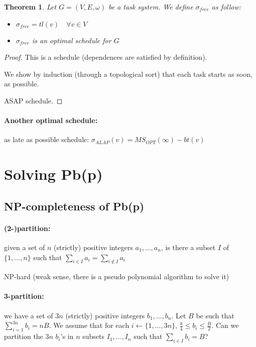 \documentclass{article}
\newtheorem{thm}{Theorem}
\begin{document}
\begin{thm}
Let $G=(V,E,\omega)$ be a task system. We define $\sigma_{free}$ as follow:
\begin{itemize}
\item $\sigma_{free}=tl(v) \quad \forall v \in V$
\item $\sigma_{free}$ is an optimal schedule for $G$
\end{itemize}
\end{thm}
\begin{proof}
This is a schedule (dependences are satisfied by definition).

We show by induction (through a topological sort) that each task starts as soon, as possible.

ASAP schedule.
\end{proof}

\paragraph{Another optimal schedule:} as late as possible schedule: $\sigma_{ALAP}(v)=MS_{OPT}(\infty) - bt(v)$

\section{Solving Pb(p)}
\subsection{NP-completeness of Pb(p)}

\paragraph{(2-)partition:} given a set of $n$ (strictly) positive integers $a_1,...,a_n$, is there a subset $I$ of $\{1,...,n\}$ such that $\sum_{i\in I} a_i=\sum_{i\notin I}a_i$

NP-hard (weak sense, there is a pseudo polynomial algorithm to solve it)


\paragraph{3-partition:} we have a set of $3n$ (strictly) positive integers $b_1,...,b_n$. Let $B$ be such that $\sum_{i=1}^{3n}b_i=nB$. We assume that for each $i\leftarrow \{ 1,...,3n\}$, $\frac{b}{4}\leq b_i \leq \frac{B}{2}$. Can we partition the $3n$ $b_i$'s in $n$ subsets $I_1, ..., I_n$ such that $\sum_{i\in I} b_i = B$?
\end{document}
